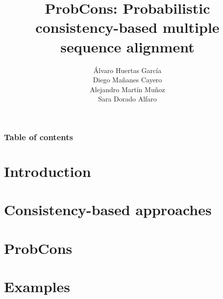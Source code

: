 \documentclass[11pt]{beamer}
\title[ProbCons]{ProbCons: Probabilistic consistency-based multiple sequence alignment}
\author[Group 5]{Álvaro Huertas García \\ Diego Mañanes Cayero
                 \\ Alejandro Martín Muñoz \\ Sara Dorado Alfaro}
\begin{document}
\frame{\titlepage}
\begin{frame}
    \frametitle{Table of contents}
    \tableofcontents
\end{frame}

\section{Introduction} 


\section{Consistency-based approaches}


\section{ProbCons}


\section{Examples}


\frame{\titlepage}
\end{document}
